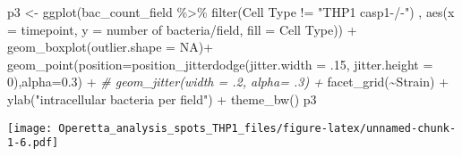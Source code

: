 \documentclass[
]{article}
\newenvironment{Shaded}{\begin{snugshade}}{\end{snugshade}}
\newcommand{\AttributeTok}[1]{\textcolor[rgb]{0.77,0.63,0.00}{#1}}
\newcommand{\CommentTok}[1]{\textcolor[rgb]{0.56,0.35,0.01}{\textit{#1}}}
\newcommand{\ConstantTok}[1]{\textcolor[rgb]{0.00,0.00,0.00}{#1}}
\newcommand{\DecValTok}[1]{\textcolor[rgb]{0.00,0.00,0.81}{#1}}
\newcommand{\FloatTok}[1]{\textcolor[rgb]{0.00,0.00,0.81}{#1}}
\newcommand{\FunctionTok}[1]{\textcolor[rgb]{0.00,0.00,0.00}{#1}}
\newcommand{\NormalTok}[1]{#1}
\newcommand{\OtherTok}[1]{\textcolor[rgb]{0.56,0.35,0.01}{#1}}
\newcommand{\SpecialCharTok}[1]{\textcolor[rgb]{0.00,0.00,0.00}{#1}}
\newcommand{\StringTok}[1]{\textcolor[rgb]{0.31,0.60,0.02}{#1}}
\begin{document}
\begin{Shaded}
\begin{Highlighting}[]
\NormalTok{p3 }\OtherTok{\textless{}{-}} \FunctionTok{ggplot}\NormalTok{(bac\_count\_field }\SpecialCharTok{\%\textgreater{}\%}
               \FunctionTok{filter}\NormalTok{(}\StringTok{\textasciigrave{}}\AttributeTok{Cell Type}\StringTok{\textasciigrave{}} \SpecialCharTok{!=} \StringTok{"THP1 casp1{-}/{-}"}\NormalTok{)}
\NormalTok{             , }\FunctionTok{aes}\NormalTok{(}\AttributeTok{x =}\NormalTok{ timepoint, }\AttributeTok{y =} \StringTok{\textasciigrave{}}\AttributeTok{number of bacteria/field}\StringTok{\textasciigrave{}}\NormalTok{, }\AttributeTok{fill =} \StringTok{\textasciigrave{}}\AttributeTok{Cell Type}\StringTok{\textasciigrave{}}\NormalTok{)) }\SpecialCharTok{+}
  \FunctionTok{geom\_boxplot}\NormalTok{(}\AttributeTok{outlier.shape =} \ConstantTok{NA}\NormalTok{)}\SpecialCharTok{+}
  \FunctionTok{geom\_point}\NormalTok{(}\AttributeTok{position=}\FunctionTok{position\_jitterdodge}\NormalTok{(}\AttributeTok{jitter.width =}\NormalTok{ .}\DecValTok{15}\NormalTok{, }\AttributeTok{jitter.height =} \DecValTok{0}\NormalTok{),}\AttributeTok{alpha=}\FloatTok{0.3}\NormalTok{) }\SpecialCharTok{+}
  \CommentTok{\#  geom\_jitter(width = .2, alpha= .3) +}
  \FunctionTok{facet\_grid}\NormalTok{(}\SpecialCharTok{\textasciitilde{}}\NormalTok{Strain) }\SpecialCharTok{+}
  \FunctionTok{ylab}\NormalTok{(}\StringTok{"intracellular bacteria per field"}\NormalTok{) }\SpecialCharTok{+}
  \FunctionTok{theme\_bw}\NormalTok{()}
\NormalTok{p3}
\end{Highlighting}
\end{Shaded}

\texttt{[image: Operetta\_analysis\_spots\_THP1\_files/figure-latex/unnamed-chunk-1-6.pdf]}
\end{document}
